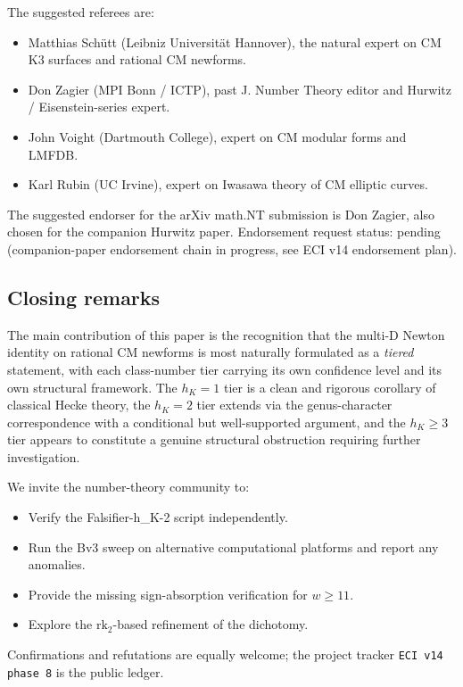 \documentclass[11pt,a4paper]{amsart}
\theoremstyle{definition}
\newcommand{\hK}{h_{K}}
\begin{document}
The suggested referees are:
\begin{itemize}[leftmargin=2em]
  \item Matthias Sch\"utt (Leibniz Universit\"at Hannover), the natural expert on CM K3 surfaces and rational CM newforms.
  \item Don Zagier (MPI Bonn / ICTP), past J. Number Theory editor and Hurwitz / Eisenstein-series expert.
  \item John Voight (Dartmouth College), expert on CM modular forms and LMFDB.
  \item Karl Rubin (UC Irvine), expert on Iwasawa theory of CM elliptic curves.
\end{itemize}

The suggested endorser for the arXiv math.NT submission is Don Zagier, also chosen for the companion Hurwitz paper. Endorsement request status: pending (companion-paper endorsement chain in progress, see ECI v14 endorsement plan).

\subsection{Closing remarks}\label{sec:conclusion-closing}

The main contribution of this paper is the recognition that the multi-D Newton identity on rational CM newforms is most naturally formulated as a \emph{tiered} statement, with each class-number tier carrying its own confidence level and its own structural framework. The $\hK = 1$ tier is a clean and rigorous corollary of classical Hecke theory, the $\hK = 2$ tier extends via the genus-character correspondence with a conditional but well-supported argument, and the $\hK \ge 3$ tier appears to constitute a genuine structural obstruction requiring further investigation.

We invite the number-theory community to:
\begin{itemize}[leftmargin=2em]
  \item Verify the Falsifier-h\_K-2 script independently.
  \item Run the Bv3 sweep on alternative computational platforms and report any anomalies.
  \item Provide the missing sign-absorption verification for $w \ge 11$.
  \item Explore the $\mathrm{rk}_2$-based refinement of the dichotomy.
\end{itemize}

Confirmations and refutations are equally welcome; the project tracker \texttt{ECI v14 phase 8} is the public ledger.
\end{document}
